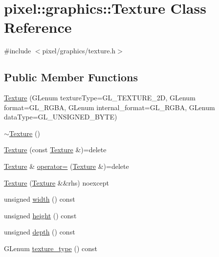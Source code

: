 \hypertarget{classpixel_1_1graphics_1_1_texture}{}\section{pixel\+:\+:graphics\+:\+:Texture Class Reference}
\label{classpixel_1_1graphics_1_1_texture}


{\ttfamily \#include $<$pixel/graphics/texture.\+h$>$}

\subsection*{Public Member Functions}
\begin{DoxyCompactItemize}
\item 
\hyperlink{classpixel_1_1graphics_1_1_texture_aa916d26adc7a411ca161aafd50fdf750}{Texture} (G\+Lenum texture\+Type=G\+L\+\_\+\+T\+E\+X\+T\+U\+R\+E\+\_\+2D, G\+Lenum format=G\+L\+\_\+\+R\+G\+BA, G\+Lenum internal\+\_\+format=G\+L\+\_\+\+R\+G\+BA, G\+Lenum data\+Type=G\+L\+\_\+\+U\+N\+S\+I\+G\+N\+E\+D\+\_\+\+B\+Y\+TE)
\item 
\hyperlink{classpixel_1_1graphics_1_1_texture_ae5214ca735ca5a0f1366f062aacf56d3}{$\sim$\+Texture} ()
\item 
\hyperlink{classpixel_1_1graphics_1_1_texture_a54bf429ae304b9b53de6b474c7aaddeb}{Texture} (const \hyperlink{classpixel_1_1graphics_1_1_texture}{Texture} \&)=delete
\item 
\hyperlink{classpixel_1_1graphics_1_1_texture}{Texture} \& \hyperlink{classpixel_1_1graphics_1_1_texture_a772f1c02f0d4b18627c7121c0cf537c1}{operator=} (\hyperlink{classpixel_1_1graphics_1_1_texture}{Texture} \&)=delete
\item 
\hyperlink{classpixel_1_1graphics_1_1_texture_af6b867c4af2be175db09deaca7c4745c}{Texture} (\hyperlink{classpixel_1_1graphics_1_1_texture}{Texture} \&\&rhs) noexcept
\item 
unsigned \hyperlink{classpixel_1_1graphics_1_1_texture_ab07e516f1b3fc101c9950b086d2dc98c}{width} () const
\item 
unsigned \hyperlink{classpixel_1_1graphics_1_1_texture_a7f1c5dd40fa624d56ad062a5dbe1d6d2}{height} () const
\item 
unsigned \hyperlink{classpixel_1_1graphics_1_1_texture_ae90ae0823981c742f0481eb315f071ab}{depth} () const
\item 
G\+Lenum \hyperlink{classpixel_1_1graphics_1_1_texture_a113f229ffb6e14b428d1716ae6740fce}{texture\+\_\+type} () const

\end{DoxyCompactItemize}
